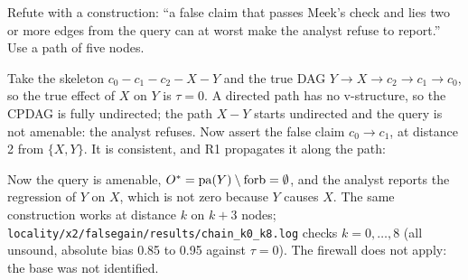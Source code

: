 \begin{exercicio}[metodo=counterexample,conceito=localidade]
\label{ex:loc-chain}
Refute with a construction: ``a false claim that passes Meek's check and lies two or more edges from
the query can at worst make the analyst refuse to report.'' Use a path of five nodes.
\end{exercicio}
\begin{solucao}
Take the skeleton $c_0 - c_1 - c_2 - X - Y$ and the true DAG $Y \to X \to c_2 \to c_1 \to c_0$, so
the true effect of $X$ on $Y$ is $\tau = 0$. A directed path has no v-structure, so the CPDAG is
fully undirected; the path $X - Y$ starts undirected and the query is not amenable: the analyst
refuses. Now assert the false claim $c_0 \to c_1$, at distance 2 from $\{X,Y\}$. It is consistent,
and R1 propagates it along the path:
\begin{center}
\end{center}
Now the query is amenable, $O^{*} = \mathrm{pa}(Y) \setminus \mathrm{forb} = \emptyset$, and the
analyst reports the regression of $Y$ on $X$, which is not zero because $Y$ causes $X$. The same
construction works at distance $k$ on $k + 3$ nodes; \texttt{locality/x2/falsegain/results/chain\_k0\_k8.log}
checks $k = 0, \dots, 8$ (all unsound, absolute bias 0.85 to 0.95 against $\tau = 0$). The
firewall does not apply: the base was not identified.
\end{solucao}

